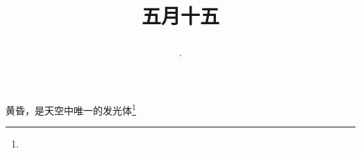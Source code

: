 \title{\date[d=20,m=6,y=2024][year:cn-y,年,month:cn,day:cn,日,·,weekday]·五月十五 }
黄昏，是天空中唯一的发光体\footnote{ }

